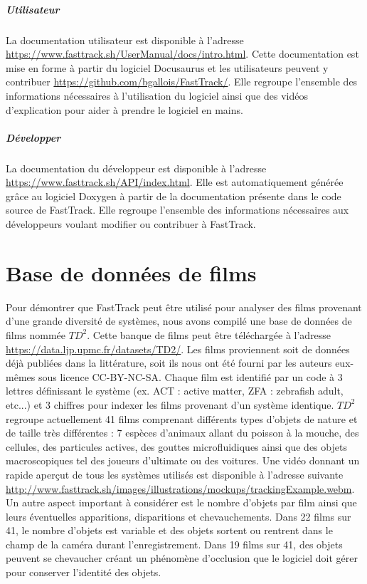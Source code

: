		\paragraph{Utilisateur} La documentation utilisateur est disponible à l'adresse \url{https://www.fasttrack.sh/UserManual/docs/intro.html}. Cette documentation est mise en forme à partir du logiciel Docusaurus et les utilisateurs peuvent y contribuer \url{https://github.com/bgallois/FastTrack/}. Elle regroupe l'ensemble des informations nécessaires à l'utilisation du logiciel ainsi que des vidéos d'explication pour aider à prendre le logiciel en mains.
		
		\paragraph{Développer} La documentation du développeur est disponible à l'adresse \url{https://www.fasttrack.sh/API/index.html}. Elle est automatiquement générée grâce au logiciel Doxygen à partir de la documentation présente dans le code source de FastTrack. Elle regroupe l'ensemble des informations nécessaires aux développeurs voulant modifier ou contribuer à FastTrack.

		
\chapter{Base de données de films}
    
    Pour démontrer que FastTrack peut être utilisé pour analyser des films provenant d'une grande diversité de systèmes, nous avons compilé une base de données de films nommée $TD^2$. Cette banque de films peut être téléchargée à l'adresse \url{https://data.ljp.upmc.fr/datasets/TD2/}. Les films proviennent soit de données déjà publiées dans la littérature, soit ils nous ont été fourni par les auteurs eux-mêmes sous licence CC-BY-NC-SA. Chaque film est identifié par un code à 3 lettres définissant le système (ex. ACT : active matter, ZFA : zebrafish adult, etc...) et 3 chiffres pour indexer les films provenant d'un système identique. $TD^2$ regroupe actuellement 41 films comprenant différents types d'objets de nature et de taille très différentes : 7 espèces d'animaux allant du poisson à la mouche, des cellules, des particules actives, des gouttes microfluidiques ainsi que des objets macroscopiques tel des joueurs d'ultimate ou des voitures. Une vidéo donnant un rapide aperçut de tous les systèmes utilisés est disponible à l'adresse suivante \url{http://www.fasttrack.sh/images/illustrations/mockups/trackingExample.webm}.
\medbreak
    Un autre aspect important à considérer est le nombre d'objets par film ainsi que leurs éventuelles apparitions, disparitions et chevauchements. Dans 22 films sur 41, le nombre d'objets est variable et des objets sortent ou rentrent dans le champ de la caméra durant l'enregistrement. Dans 19 films sur 41, des objets peuvent se chevaucher créant un phénomène d'occlusion que le logiciel doit gérer pour conserver l'identité des objets.

